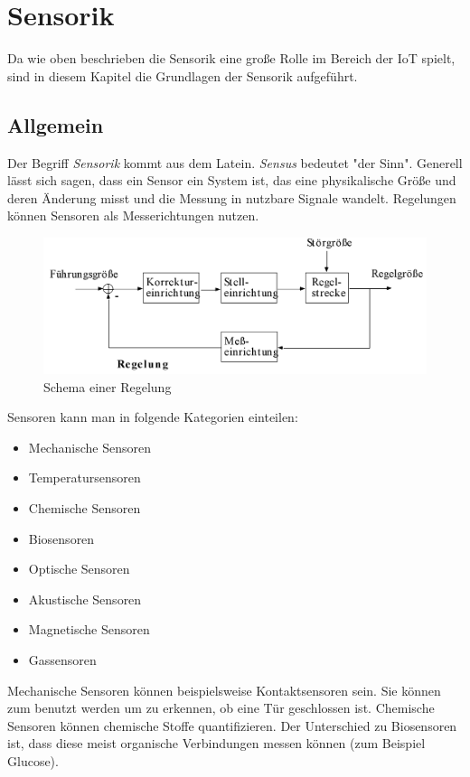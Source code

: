 \section{Sensorik}
Da wie oben beschrieben die Sensorik eine große Rolle im Bereich der IoT spielt, sind in diesem Kapitel die Grundlagen der Sensorik aufgeführt.  
\subsection{Allgemein}
Der Begriff \textit{Sensorik} kommt aus dem Latein. \textit{Sensus} bedeutet "der Sinn". Generell lässt sich sagen, dass ein Sensor ein System ist, das eine physikalische Größe und deren Änderung misst und die Messung in nutzbare Signale wandelt. 
Regelungen können Sensoren als Messerichtungen nutzen.  

\begin{figure}
\includegraphics[scale=0.3
]{bilder/regelung} 
\caption[Schema einer Regelung]{Schema einer Regelung \cite{strand}}
\label{IPv4}
\end{figure}

Sensoren kann man in folgende Kategorien einteilen:
\begin{itemize}
\item Mechanische Sensoren
\item Temperatursensoren 
\item Chemische Sensoren
\item Biosensoren
\item Optische Sensoren 
\item Akustische Sensoren
\item Magnetische Sensoren 
\item Gassensoren
\end{itemize}

Mechanische Sensoren können beispielsweise Kontaktsensoren sein. Sie können zum benutzt werden um zu erkennen, ob eine Tür geschlossen ist. Chemische Sensoren können chemische Stoffe quantifizieren. Der Unterschied zu Biosensoren ist, dass diese meist organische Verbindungen messen können (zum Beispiel Glucose). 

